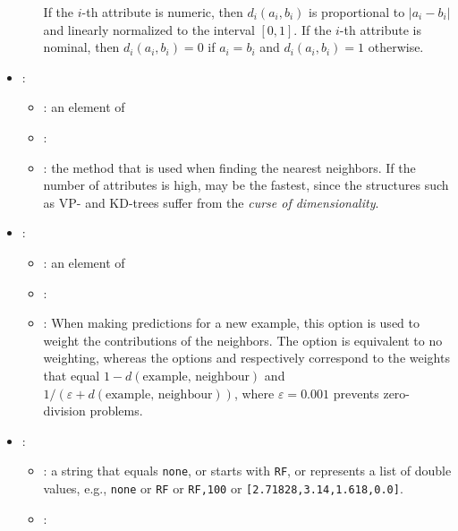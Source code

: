 \begin{itemize}
\begin{itemize}
        If the $i$-th attribute is numeric, then $d_i(a_i, b_i)$ is proportional to $|a_i - b_i|$ and linearly normalized to the interval $[0, 1]$.
        If the $i$-th attribute is nominal, then $d_i(a_i, b_i) = 0$ if $a_i = b_i$ and  $d_i(a_i, b_i) = 1$ otherwise.
    \end{itemize}
    \item {}:
    \begin{itemize}
        \item \optionPossibleValues{}: an element of 
        \item \optionDefaultValue{}: 
        \item \optionDescrption{}: the method that is used when finding the nearest neighbors. If the number of attributes is high, 
        may be the fastest, since the structures such as VP- and KD-trees suffer from the \emph{curse of dimensionality}.
    \end{itemize}
    \item {}:
    \begin{itemize}
        \item \optionPossibleValues{}: an element of 
        \item \optionDefaultValue{}: 
        \item \optionDescrption{}: When making predictions for a new example, this option is used to weight the contributions of the neighbors. The option 
        is equivalent to no weighting, whereas the options  and  respectively correspond to the weights that equal
        $1 - d(\text{example, neighbour})$ and $1 / (\varepsilon + d(\text{example, neighbour}))$, where $\varepsilon = 0.001$ prevents zero-division
        problems.
    \end{itemize}
    \item {}:
    \begin{itemize}
        \item \optionPossibleValues{}: a string that equals {\tt none}, or starts with {\tt RF}, or represents a list of double values, e.g.,
        {\tt none} or {\tt RF} or {\tt RF,100} or {\tt [2.71828,3.14,1.618,0.0]}.
        \item \optionDefaultValue{}: 

\end{itemize}
\end{itemize}
